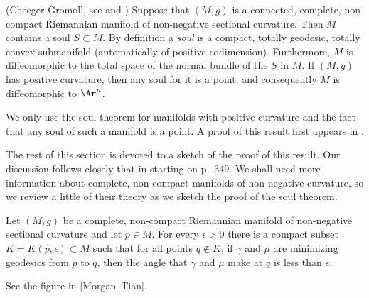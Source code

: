 \begin{theorem}
\label{thm:soul-theorem}
\label{soul}
(Cheeger-Gromoll, see
\cite{CheegerGromollbul} and \cite{CheegerGromoll}) Suppose that
$(M,g)$ is a connected, complete, non-compact Riemannian manifold of
non-negative sectional curvature. Then $M$ contains a soul $S\subset
M$. By definition a {\em soul} is a compact, totally
geodesic, totally convex submanifold (automatically of positive
codimension). Furthermore, $M$ is diffeomorphic to the total space
of the normal bundle of the $S$ in $M$. If $(M,g)$ has positive
curvature, then any soul for it is a point, and consequently $M$ is
diffeomorphic to $\Ar^n$.
\end{theorem}


\begin{remark}
\label{rem:soul-theorem-positive-curvature}
We only use the soul theorem for manifolds with positive curvature
and the fact that any soul of such a manifold is a point. A proof of
this result first appears in \cite{GromollMeyer}.
\end{remark}



The rest of this section is devoted to a sketch of the proof of this
result. Our discussion follows closely that in \cite{Petersen}
starting on p.~349. We shall need more information about complete,
non-compact manifolds of non-negative curvature, so we review a
little of their theory as we sketch the proof of the soul theorem.

\begin{lemma}
\label{lem:angle-convergence-infinity}
Let $(M,g)$ be a complete, non-compact Riemannian manifold of
non-negative sectional curvature and let $p\in M$. For every
$\epsilon>0$ there is a compact subset $K=K(p,\epsilon)\subset M$
such that for all points $q\notin K$, if $\gamma$ and $\mu$ are
minimizing geodesics from $p$ to $q$, then the angle that $\gamma$
and $\mu$ make at $q$ is less than $\epsilon$.
\end{lemma}

See the figure in [Morgan--Tian].

